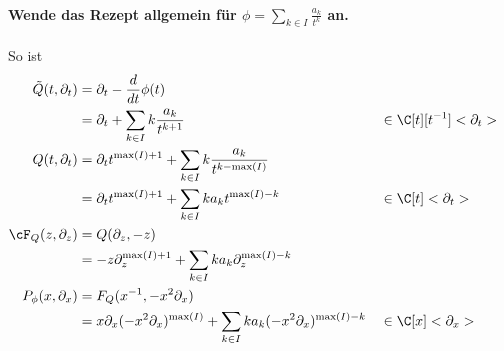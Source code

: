 \paragraph{Wende das Rezept allgemein für
$\phi=\sum_{k\in I}\frac{a_k}{t^{k}}$ an.}
So ist
\begin{align*}
\tilde Q(t,\partial_t) &=\partial_t-\frac{d}{dt}\phi(t) \\
                       &=\partial_t+\sum_{k\in I} k\frac{a_k}{t^{k+1}}
                       & &\in \C[t][t^{-1}]<\partial_t>\\
Q(t,\partial_t)        &=\partial_tt^{\max(I)+1}
                         +\sum_{k\in I} k\frac{a_k}{t^{k-\max(I)}} \\
                       &=\partial_tt^{\max(I)+1}
                         +\sum_{k\in I}k a_k t^{\max(I)-k}
                       & &\in \C[t]<\partial_t>\\
\cF_Q(z,\partial_z)    &=Q(\partial_z,-z)\\
                       &=-z\partial_z^{\max(I)+1}
                         +\sum_{k\in I}k a_k\partial_z^{\max(I)-k} \\
P_{\phi}(x,\partial_x) &=F_Q(x^{-1},-x^2\partial_x) \\
                       &=x\partial_x(-x^2\partial_x)^{\max(I)}
                         +\sum_{k\in I}k a_k(-x^2\partial_x)^{\max(I)-k}
                       & &\in \C[x]<\partial_x>
\end{align*}

